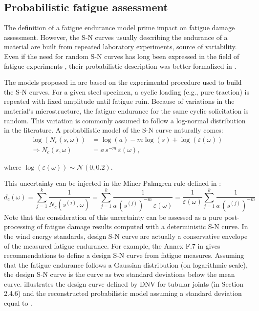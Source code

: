 \subsection{Probabilistic fatigue assessment}
The definition of a fatigue endurance model prime impact on fatigue damage assessment. 
However, the S-N curves usually describing the endurance of a material are built from repeated laboratory experiments, source of variability. 
Even if the need for random S-N curves has long been expressed in the field of fatigue experiments \citep{lieurade_1982_essais_fatigue}, their probabilistic description was better formalized in \citep{guede_2007,sudret_2013_fatigue}. 

The models proposed in \citet{guede_2007} are based on the experimental procedure used to build the S-N curves. 
For a given steel specimen, a cyclic loading (e.g., pure traction) is repeated with fixed amplitude until fatigue ruin. 
Because of variations in the material's microstructure, the fatigue endurance for the same cyclic solicitation is random. 
This variation is commonly assumed to follow a log-normal distribution in the literature. 
A probabilistic model of the S-N curve naturally comes: 
\begin{subequations}
    \begin{align}
        \log(N_c(s, \omega)) &= \log(a) - m \log(s) + \log(\varepsilon(\omega))\\
        \Rightarrow N_c(s, \omega) &= a \, s^{-m} \, \varepsilon(\omega),
    \end{align}
\end{subequations}

where $\log(\varepsilon(\omega)) \sim \mathcal{N}(0, 0.2)$. 

This uncertainty can be injected in the Miner-Palmgren rule defined in : 
\begin{equation}
    d_c(\omega) = \sum_{j=1}^k \frac{1}{N_c(s^{(j)}, \omega)}
            = \sum_{j=1}^k \frac{1}{a \, \left(s^{(j)}\right)^{-m} \, \varepsilon(\omega)}
            = \frac{1}{\varepsilon(\omega)} \sum_{j=1}^k \frac{1}{a \, \left(s^{(j)}\right)^{-m}}
\end{equation}
Note that the consideration of this uncertainty can be assessed as a pure post-processing of fatigue damage results computed with a deterministic S-N curve. 
In the wind energy standards, design S-N curve are actually a conservative envelope of the measured fatigue endurance. 
For example, the Annex F.7 in \citet{dnv_fatigue_2016} gives recommendations to define a design S-N curve from fatigue measures. 
Assuming that the fatigue endurance follows a Gaussian distribution (on logarithmic scale), the design S-N curve is the curve as two standard deviations below the mean curve. 
 illustrates the design curve defined by DNV for tubular joints (in Section 2.4.6) and the reconstructed probabilistic model assuming a standard deviation equal to . 

